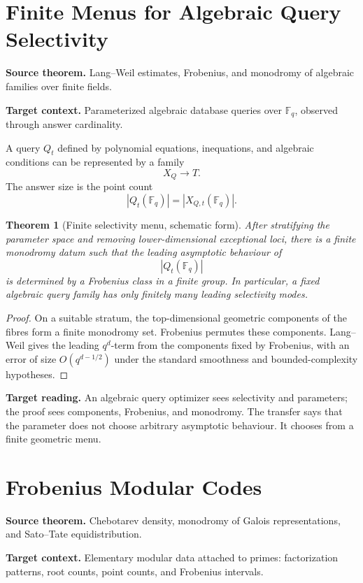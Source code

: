 \documentclass[11pt]{article}
\newtheorem{theorem}{Theorem}[section]
\begin{document}
\section{Finite Menus for Algebraic Query Selectivity}

\textbf{Source theorem.}
Lang--Weil estimates, Frobenius, and monodromy of algebraic families over finite fields.

\textbf{Target context.}
Parameterized algebraic database queries over \(\mathbb F_q\), observed through answer cardinality.

A query \(Q_t\) defined by polynomial equations, inequations, and algebraic conditions can be represented by a family
\[
X_Q\to T.
\]
The answer size is the point count
\[
|Q_t(\mathbb F_q)|=|X_{Q,t}(\mathbb F_q)|.
\]

\begin{theorem}[Finite selectivity menu, schematic form]
After stratifying the parameter space and removing lower-dimensional exceptional loci, there is a finite monodromy datum such that the leading asymptotic behaviour of
\[
|Q_t(\mathbb F_q)|
\]
is determined by a Frobenius class in a finite group. In particular, a fixed algebraic query family has only finitely many leading selectivity modes.
\end{theorem}

\begin{proof}
On a suitable stratum, the top-dimensional geometric components of the fibres form a finite monodromy set. Frobenius permutes these components. Lang--Weil gives the leading \(q^d\)-term from the components fixed by Frobenius, with an error of size \(O(q^{d-1/2})\) under the standard smoothness and bounded-complexity hypotheses.
\end{proof}

\textbf{Target reading.}
An algebraic query optimizer sees selectivity and parameters; the proof sees components, Frobenius, and monodromy. The transfer says that the parameter does not choose arbitrary asymptotic behaviour. It chooses from a finite geometric menu.

\section{Frobenius Modular Codes}

\textbf{Source theorem.}
Chebotarev density, monodromy of Galois representations, and Sato--Tate equidistribution.

\textbf{Target context.}
Elementary modular data attached to primes: factorization patterns, root counts, point counts, and Frobenius intervals.
\end{document}
